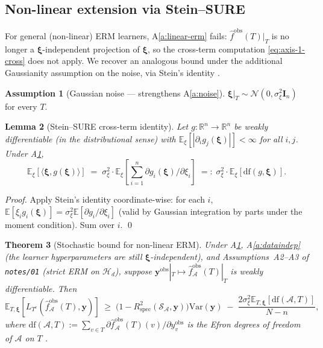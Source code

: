 \documentclass[11pt,a4paper]{article}
\theoremstyle{plain}
\newtheorem{theorem}{Theorem}
\newtheorem{lemma}[theorem]{Lemma}
\theoremstyle{definition}
\newtheorem{assumption}[theorem]{Assumption}
\theoremstyle{remark}
\newcommand{\by}{\mathbf{y}}
\newcommand{\bxi}{\boldsymbol{\xi}}
\newcommand{\bI}{\mathbf{I}}
\newcommand{\E}{\mathbb{E}}
\newcommand{\R}{\mathbb{R}}
\newcommand{\Var}{\mathrm{Var}}
\newcommand{\Rspec}{R^2_{\mathrm{spec}}}
\newcommand{\Scal}{\mathcal{S}}
\newcommand{\Acal}{\mathcal{A}}
\newcommand{\Hcal}{\mathcal{H}}
\newcommand{\df}{\mathrm{df}}
\begin{document}
\subsection{Non-linear extension via Stein--SURE}
\label{subsec:axis-1-stein}

For general (non-linear) ERM learners, A\ref{a:linear-erm} fails:
$\hat f^{\mathrm{obs}}(T)|_T$ is no longer a $\bxi$-independent
projection of $\bxi$, so the cross-term computation
\eqref{eq:axis-1-cross} does not apply. We recover an analogous
bound under the additional Gaussianity assumption on the noise,
via Stein's identity \citep[][Lemma~2]{Stein1981}.

\begin{assumption}[Gaussian noise --- strengthens A\ref{a:noise}]
\label{a:gauss-noise}
$\bxi|_T \sim \mathcal{N}(0, \sigma_\xi^2 \bI_n)$ for every $T$.
\end{assumption}

\begin{lemma}[Stein--SURE cross-term identity]
\label{lem:stein-sure}
Let $g : \R^n \to \R^n$ be weakly differentiable (in the
distributional sense) with $\E_\xi[|\partial_i g_j(\bxi)|] < \infty$
for all $i, j$. Under A\ref{a:gauss-noise},
\begin{equation}
    \E_\xi[\langle \bxi, g(\bxi)\rangle]
    \;=\; \sigma_\xi^2 \cdot \E_\xi\!\left[\sum_{i=1}^n \partial g_i(\bxi)/\partial \xi_i\right]
    \;=:\; \sigma_\xi^2 \cdot \E_\xi[\df(g, \bxi)].
    \label{eq:stein-sure}
\end{equation}
\end{lemma}

\begin{proof}
Apply Stein's identity \citep[][Lemma~2]{Stein1981} coordinate-wise:
for each $i$, $\E[\xi_i g_i(\bxi)] = \sigma_\xi^2 \E[\partial g_i/\partial \xi_i]$
(valid by Gaussian integration by parts under the moment condition).
Sum over $i$. \qed
\end{proof}

\begin{theorem}[Stochastic bound for non-linear ERM]
\label{thm:axis-1-stein}
Under A\ref{a:gauss-noise}, A\ref{a:dataindep} (the learner
hyperparameters are still $\bxi$-independent), and Assumptions~A2--A3
of \texttt{notes/01} (strict ERM on $\Hcal_d$), suppose
$\by^{\mathrm{obs}}|_T \mapsto \hat f^{\mathrm{obs}}_\Acal(T)|_T$ is
weakly differentiable. Then
\begin{equation}
    \E_{T,\bxi}\!\left[L_{T^c}(\hat f^{\mathrm{obs}}_\Acal(T), \by)\right]
    \;\ge\; \big(1 - \Rspec(\Scal_\Acal, \by)\big)\Var(\by)
        \;-\; \frac{2\sigma_\xi^2 \E_{T,\bxi}[\df(\Acal, T)]}{N-n},
    \label{eq:axis-1-stein}
\end{equation}
where $\df(\Acal, T) := \sum_{v \in T} \partial \hat f^{\mathrm{obs}}_\Acal(T)(v)/\partial y^{\mathrm{obs}}_v$
is the Efron degrees of freedom of $\Acal$ on $T$
\citep{Efron1986}.
\end{theorem}
\end{document}
